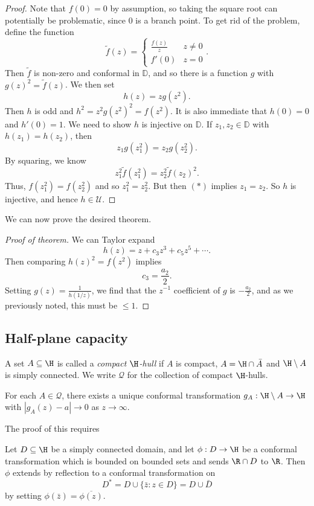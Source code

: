 \documentclass[a4paper]{article}
\renewcommand\D{\mathbb{D}}
\begin{document}
\begin{proof}
  Note that $f(0) = 0$ by assumption, so taking the square root can potentially be problematic, since $0$ is a branch point. To get rid of the problem, define the function
  \[
    \tilde{f}(z) =
    \begin{cases}
      \frac{f(z)}{z} & z \not =0\\
      f'(0) & z = 0
    \end{cases}.
  \]
  Then $\tilde{f}$ is non-zero and conformal in $\D$, and so there is a function $g$ with $g(z)^2 = \tilde{f}(z)$. We then set
  \[
    h(z) = z g(z^2).
  \]
  Then $h$ is odd and $h^2 = z^2 g(z^2)^2 = f(z^2)$. It is also immediate that $h(0) = 0 $ and $h'(0) = 1$. We need to show $h$ is injective on $\D$. If $z_1, z_2 \in \D$ with $h(z_1) = h(z_2)$, then
  \[
    z_1 g(z_1^2) = z_2 g(z_2^2).\tag{$*$}
  \]
  By squaring, we know
  \[
    z_1^2 \tilde{f}(z_1^2) = z_2^2 \tilde{f}(z_2)^2.
  \]
  Thus, $f(z_1^2) = f(z_2^2)$ and so $z_1^2 = z_2^2$. But then $(*)$ implies $z_1 = z_2$. So $h$ is injective, and hence $h \in \mathcal{U}$.
\end{proof}

We can now prove the desired theorem.
\begin{proof}[Proof of theorem]
  We can Taylor expand
  \[
    h(z) = z + c_3 z^3 + c_5 z^5 + \cdots.
  \]
  Then comparing $h(z)^2 = f(z^2)$ implies
  \[
    c_3 = \frac{a_2}{2}.
  \]
  Setting $g(z) = \frac{1}{h(1/z)}$, we find that the $z^{-1}$ coefficient of $g$ is $-\frac{a_2}{2}$, and as we previously noted, this must be $\leq 1$.
\end{proof}
\subsection{Half-plane capacity}
\begin{defi}
  A set $A \subseteq \H$ is called a \emph{compact $\H$-hull} if $A$ is compact, $A = \H \cap \bar{A}$ and $\H \setminus A$ is simply connected. We write $\mathcal{Q}$ for the collection of compact $\H$-hulls.
\end{defi}

\begin{prop}
  For each $A \in \mathcal{Q}$, there exists a unique conformal transformation $g_A: \H \setminus A \to \H$ with $|g_A(z) - a| \to 0$ as $z \to \infty$.
\end{prop}

The proof of this requires
\begin{thm}
  Let $D \subseteq \H$ be a simply connected domain, and let $\phi: D \to \H$ be a conformal transformation which is bounded on bounded sets and sends $\R \cap D$ to $\R$. Then $\phi$ extends by reflection to a conformal transformation on
  \[
    D^* = D \cup \{\bar{z} : z \in D\} = D \cup \bar{D}
  \]
  by setting $\phi(\bar{z}) = \overline{\phi(z)}$.\fakeqed
\end{thm}
\end{document}
